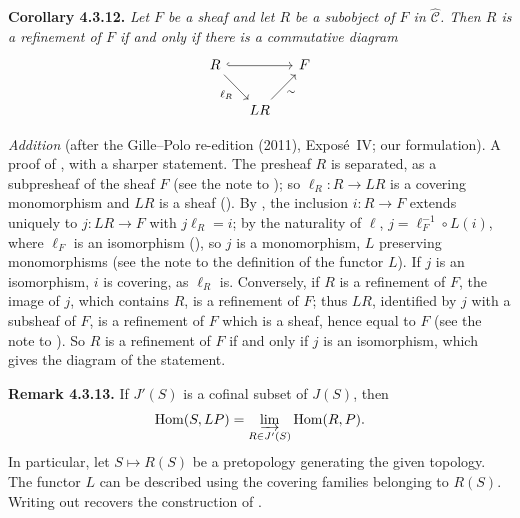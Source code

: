 \medskip
\noindent{}\textbf{Corollary 4.3.12.}
\textit{Let \(F\) be a sheaf and let \(R\) be a subobject of \(F\) in
\(\widehat{\mathscr C}\). Then \(R\) is a refinement of \(F\) if and only if
there is a commutative diagram}
\[
\begin{tikzcd}[column sep=small]
 R \arrow[rr,hook] \arrow[dr,"\ell_R"'] && F\\
 & LR \arrow[ur,"\sim"'] &
\end{tikzcd}
\]

\par\medskip\noindent
\emph{Addition} (after the Gille--Polo re-edition (2011), Expos\'e~IV; our
formulation).  A proof of , with a sharper statement. The presheaf
\(R\) is separated, as a subpresheaf of the sheaf \(F\) (see the note to
); so \(\ell_R\colon R\to LR\) is a covering monomorphism and \(LR\) is
a sheaf (). By , the inclusion \(i\colon R\to F\)
extends uniquely to \(j\colon LR\to F\) with \(j\ell_R=i\); by the naturality
of \(\ell\), \(j=\ell_F^{-1}\circ L(i)\), where \(\ell_F\) is an isomorphism
(), so \(j\) is a monomorphism, \(L\) preserving monomorphisms (see
the note to the definition of the functor \(L\)). If \(j\) is an isomorphism,
\(i\) is covering, as \(\ell_R\) is. Conversely, if \(R\) is a refinement of
\(F\), the image of \(j\), which contains \(R\), is a refinement of \(F\);
thus \(LR\), identified by \(j\) with a subsheaf of \(F\), is a refinement of
\(F\) which is a sheaf, hence equal to \(F\) (see the note to ). So
\(R\) is a refinement of \(F\) if and only if \(j\) is an isomorphism, which
gives the diagram of the statement.
\par\medskip

\medskip
\noindent{}\textbf{Remark 4.3.13.}
If \(J'(S)\) is a cofinal subset of \(J(S)\), then
\[
 \operatorname{Hom}(S,LP)=
 \varinjlim_{R\in J'(S)}\operatorname{Hom}(R,P).
\]
In particular, let \(S\mapsto R(S)\) be a pretopology generating
the given topology. The functor \(L\) can be described using the covering
families belonging to \(R(S)\). Writing out 
recovers the construction of .

